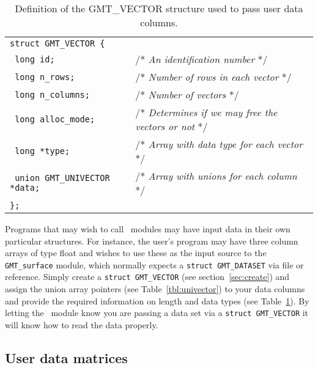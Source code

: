 \documentclass{report}
\begin{document}
\begin{table}[h]
\small
\centering
\begin{tabular}{ll} \hline
\multicolumn{2}{l}{\texttt{struct GMT\_VECTOR \{}} \\ 
\texttt{	long id;}		&       /* \emph{An identification number} */ \\
\texttt{	long n\_rows;}		&       /* \emph{Number of rows in each vector} */ \\
\texttt{	long n\_columns;}	&       /* \emph{Number of vectors}  */\\
\texttt{	long alloc\_mode;}	&       /* \emph{Determines if we may free the vectors or not}  */\\
\texttt{	long *type;}		&       /* \emph{Array with data type for each vector}  */\\
\texttt{	union GMT\_UNIVECTOR *data;}	&       /* \emph{Array with unions for each column}  */\\
\texttt{\};}	&        \\  \hline
\end{tabular}
\caption{Definition of the GMT\_VECTOR structure used to pass user data columns.}
\label{tbl:vector}
\end{table}
\noindent
Programs that may wish to call \GMT\ modules may have input data in their own particular
structures.  For instance, the user's program may have three column arrays of type float
and wishes to use these as the input source to the \texttt{GMT\_surface} module, which normally
expects a \texttt{struct GMT\_DATASET} via file or reference.  Simply create a \texttt{struct GMT\_VECTOR}
(see section~\ref{sec:create}) and assign the union array pointers  (see Table~\ref{tbl:univector}) to your data columns and provide
the required information on length and data types (see Table~\ref{tbl:vector}).
By letting the \GMT\ module know you are passing a data set via a \texttt{struct GMT\_VECTOR} it will know how to
read the data properly.

\subsection{User data matrices}
\end{document}
